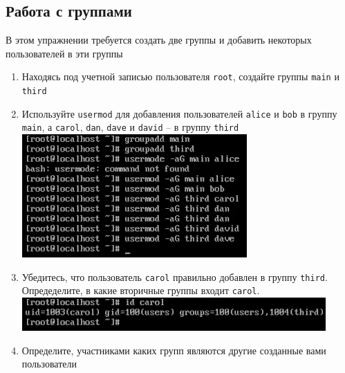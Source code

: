 \documentclass[12pt]{article}
\begin{document}
    \subsection{Работа с группами}
      В этом упражнении требуется создать две группы и добавить некоторых пользователей в эти группы
      \begin{enumerate}
        \item Находясь под учетной записью пользователя \texttt{root}, создайте группы \texttt{main} и \texttt{third}
        \item Используйте \texttt{usermod} для добавления пользователей \texttt{alice} и \texttt{bob} в группу \texttt{main}, а \texttt{carol}, \texttt{dan}, \texttt{dave} и \texttt{david} -- в группу \texttt{third}
          \\\includegraphics{13.png}\\
        \item Убедитесь, что пользователь \texttt{carol} правильно добавлен в группу \texttt{third}.\\
          Опредеделите, в какие вторичные группы входит \texttt{carol}.
          \\\includegraphics{14.png}\\
        \item Определите, участниками каких групп являются другие созданные вами пользователи
      \end{enumerate}
\end{document}
